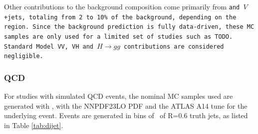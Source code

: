 Other contributions to the background composition come primarily from \tt and $V$+jets, totaling from 2 to 10\% of the background, depending on the region.
Since the background prediction is fully data-driven, these MC samples are only used for a limited set of studies such as TODO.
Standard Model VV, VH and $H \rightarrow gg$ contributions are considered negligible.

\subsubsection{QCD}
For studies with simulated QCD events, the nominal MC samples used are generated with , with the NNPDF23LO PDF and the ATLAS A14 tune for the underlying event. Events are generated in bins of \pt\ of \akt R=0.6 truth jets, as listed in Table \ref{tab:dijet}.

